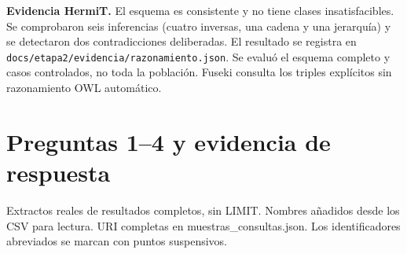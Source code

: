 \documentclass[11pt,a4paper]{article}
\begin{document}
\textbf{Evidencia HermiT.} El esquema es consistente y no tiene clases insatisfacibles. Se comprobaron seis inferencias (cuatro inversas, una cadena y una jerarquía) y se detectaron dos contradicciones deliberadas. El resultado se registra en \texttt{docs/etapa2/evidencia/razonamiento.json}. Se evaluó el esquema completo y casos controlados, no toda la población. Fuseki consulta los triples explícitos sin razonamiento OWL automático.
\newpage
\section{Preguntas 1--4 y evidencia de respuesta}
{\small Extractos reales de resultados completos, sin LIMIT. Nombres añadidos desde los CSV para lectura. URI completas en muestras\_consultas.json. Los identificadores abreviados se marcan con puntos suspensivos.}
\end{document}
